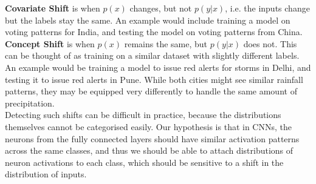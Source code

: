 \documentclass{article}
\begin{document}
        \textbf{Covariate Shift} is when $p(x)$ changes, but not $p(y|x)$, i.e. the inputs change but the labels stay the same. An example would include training a model on voting patterns for India, and testing the model on voting patterns from China. \\
        
        \textbf{Concept Shift} is when $p(x)$ remains the same, but $p(y | x)$ does not. This can be thought of as training on a similar dataset with slightly different labels. An example would be training a model to issue red alerts for storms in Delhi, and testing it to issue red alerts in Pune. While both cities might see similar rainfall patterns, they may be equipped very differently to handle the same amount of precipitation. \\

        Detecting such shifts can be difficult in practice, because the distributions themselves cannot be categorised easily. Our hypothesis is that in CNNs, the neurons from the fully connected layers should have similar activation patterns across the same classes, and thus we should be able to attach distributions of neuron activations to each class, which should be sensitive to a shift in the distribution of inputs. \\
        
\end{document}
